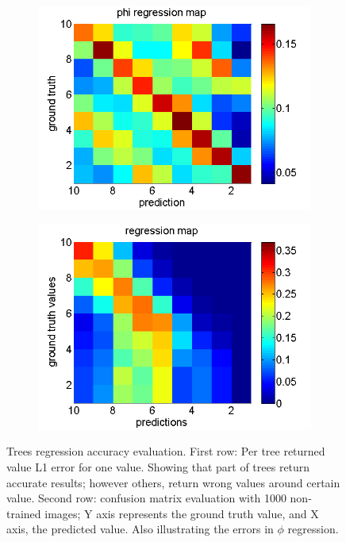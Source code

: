 \documentclass[annual]{acmsiggraph}
\begin{document}
\begin{figure}[h]
\begin{subfigure}[c]{0.5\columnwidth} \includegraphics[width=\textwidth]{images/phi_map.png} \end{subfigure}%
\begin{subfigure}[c]{0.5\columnwidth} \includegraphics[width=\textwidth]{images/theta_map.png} \end{subfigure}%
\caption{ Trees regression accuracy evaluation. First row: Per tree returned value L1 error for one value. Showing that part of trees return accurate results; however others, return wrong values around certain value. Second row: confusion matrix evaluation with 1000 non-trained images; Y axis represents the ground truth value, and X axis, the predicted value. Also illustrating the errors in $\phi$ regression.}
\label{img:treeResults}
\end{figure}
\end{document}
